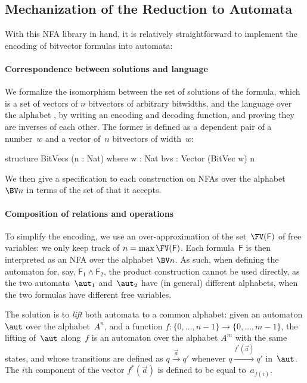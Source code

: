 \subsection{Mechanization of the Reduction to Automata}

With this NFA library in hand, it is relatively straightforward to implement the
encoding of bitvector formulas into automata:

\paragraph{Correspondence between solutions and language}

We formalize the isomorphism between the set of solutions of the
formula, which is a set of vectors of $n$ bitvectors of arbitrary bitwidths,
and the language over the alphabet , by writing an encoding
and decoding function, and proving they are inverses of each other.
%
The former is defined as a dependent pair of a number~$w$ and a vector of~$n$
bitvectors of width~$w$:
%
\begin{lean}
 structure BitVecs (n : Nat) where
  w : Nat
  bvs : Vector (BitVec w) n
\end{lean}
%
We then give a specification to each construction on NFAs over the alphabet~$\BV
n$ in terms of the set of  that it accepts.

\paragraph{Composition of relations and operations}

To simplify the encoding, we use an over-approximation of the set~$\FV(\mathsf
F)$ of free variables: we only keep track of $n = \max \FV(\mathsf F)$.
%
Each formula~$\textsf{F}$ is then interpreted as an NFA over the alphabet $\BV
n$. As such, when defining the automaton for, say, $\mathsf F_1 \land \mathsf
F_2$, the product construction cannot be used directly, as the two
automata~$\aut_1$ and~$\aut_2$ have (in general) different alphabets, when the
two formulas have different free variables.
%

The solution is to \emph{lift} both automata to a common alphabet: given an
automaton $\aut$ over the alphabet~$A^n$, and a function $f : \{0, \dots, n-1\}
\to \{0, \dots, m-1\}$, the lifting of~$\aut$ along~$f$ is an automaton over the
alphabet $A^m$ with the same states, and whose transitions are defined as $q
\xrightarrow{\vec{a}} q'$ whenever $q \xrightarrow{f^*(\vec{a})} q'$ in~$\aut$.
%
The $i$th component of the vector $f^*(\vec{a})$ is defined to be equal
to~$a_{f(i)}$.

